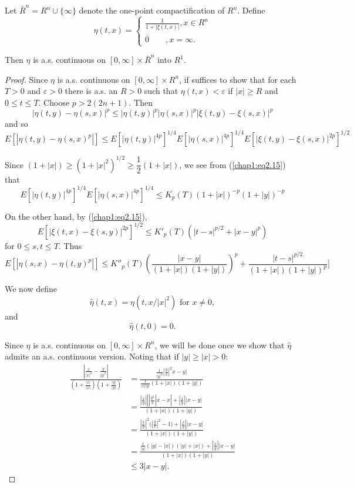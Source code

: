 \setcounter{lemma}{18}
\begin{lemma} %
Let $\bar{R}^{n}=R^n \cup \{ \infty \}$ denote the one-point
compactification of $R^n$. Define 
\begin{equation*}
\eta (t,x)=
\begin{cases}
\frac{1}{1+|\xi (t,x)|},x \in R^n \\ \overset{.}0 \qquad ,x = \infty .
\end{cases}
\end{equation*}

Then $\eta$ is a.s. continuous on $[0, \infty] \times \bar{R}^{n}$ into $R^1$.
\end{lemma}

\begin{proof}
Since $\eta$ is a.s. continuous on $[0, \infty] \times R^n$, if
suffices to show that for each $T >0$ and $\varepsilon >0$ there is
a.s. an $R > 0$ such that $\eta (t,x)< \varepsilon $ if $|x| \ge R$
and $0 \le t \le T$. Choose $p>2(2n+1)$. Then 
$$
|\eta (t,y)-\eta (s,x)|^p \le |\eta (t,y)|^p |\eta (s,x)|^p |\xi
(t,y)-\xi (s,x)|^p 
$$
and so\pageoriginale
{\fontsize{10pt}{12pt}\selectfont
$$
E[|\eta (t,y)- \eta (s,x)^p|] \le E[|\eta (t,y)|^{4p}]^{1/4} E [|\eta
  (s,x)|^{4p}]^{1/4} E [|\xi(t,y)- \xi (s,x)|^{2p}]^{1/2} 
$$}\relax


Since $(1+|x|) \ge (1+ |x|^2)^{1/2} \ge \dfrac{1}{2}(1+|x|)$, we see
from (\ref{chap1:eq2.15}) that  
$$
E[|\eta (t,y)|^{4p}]^{1/4} E [|\eta (s,x)|^{4p}]^{1/4} \le K_p (T) 
(1+|x|)^{-p} (1+|y|)^{-p} 
$$

On the other hand, by (\ref{chap1:eq2.15}),
$$
E [|\xi (t,x)-\xi (s,y)|^{2p}]^{1/2} \le K'_p (T)(|t-s|^{p/2}+|x-y|^p) 
$$
for $0 \le s,t \le T$. Thus
$$
E[|\eta (s,x)- \eta (t,y)^p|] \le K''_p(T)
(\frac{|x-y|}{(1+|x|)(1+|y|)} )^p
+\frac{|t-s|^{p/2}}{(1+|x|)(1+|y|)^p} ] 
$$
 
We now define
$$
\hat{\eta} (t,x)= \eta (t,x/|x|^2) \text{ for } x \neq 0, 
$$
and 
$$
\hat{\eta}(t,0)=0. 
$$

Since $\eta$ is a.s. continuous on $[0, \infty] \times R^n$, we will
be done once we show that $\hat {\eta}$ admits an a.s. continuous
version. Noting that if $|y| \ge |x|>0$: 
\begin{align*}
\frac{ |\frac{x}{|x|^2}- \frac{y}{|y|^2}|}{ (1+ \frac{|x|}{|x|}) (1+
  \frac{|y|}{|y|})} &= \frac{\frac{1}{|y|^2} |\frac{y}{x}|^2 x-y
  |}{\frac{1}{|x| |y|}(1+ |x|) (1+|y|)}\\[5pt] 
&= \frac{ \left| \frac{x}{y}\right | | \left | \frac{y^2}{x} \right |
  x-x|+ \left |\frac{x}{y}\right | |x-y |}{(1+ |x|)(1+ |y|)}\\[5pt]  
&= \frac{ \left | \frac{x}{y} \right |^2 \bigg ( \left |\frac{y}{x}
  \right |^2-1 \bigg ) + \left |\frac{x}{y}\right ||x-y|}
     {(1+|x|)(1+|y|)}\\[5pt]  
&= \frac{\frac{1}{|y|} (|y|-|x|)(|y|+|x|) + \left |\frac{x}{y} \right
       | |x-y|} {(1+|x|)(1+|y|)}\\[5pt]  
& \le 3|x-y|.
\end{align*}\pageoriginale


\end{proof}
